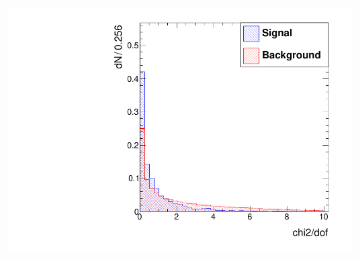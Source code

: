 \documentclass[10pt,a4paper]{article}
\begin{document}
\begin{figure}
\begin{subfigure}[b]{0.2\textwidth}
                \label{fig:fls3dEndcaps}
        \end{subfigure}
        ~
        \begin{subfigure}[b]{0.2\textwidth}
                \centering
                \includegraphics[width=\textwidth]{Figures/chi2dof_endcaps}
                \label{fig:chi2dofEndcaps}
        \end{subfigure}
        

\end{figure}
\end{document}
